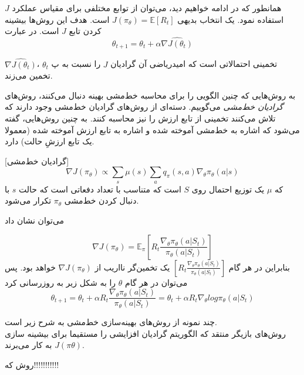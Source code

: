 همانطور که در ادامه خواهیم دید، می‌توان از توابع مختلفی برای مقیاس عملکرد $J$ استفاده نمود. یک انتخاب بدیهی 
$J(\pi_\theta) = \mathbb{E}[R_t]$
است. هدف این روش‌ها بیشینه کردن تابع $J$ است. در عبارت 
$$\theta_{t+1}=\theta_t + \alpha \hat{\nabla J(\theta_t)}$$
 
$\hat{\nabla J(\theta_t)}$،
تخمینی احتمالاتی است که امیدریاضی آن گرادیان  $J$ را نسبت به پ $\theta_t$ تخمین می‌زند.

به روش‌هایی که چنین الگویی را برای محاسبه خط‌مشی بهینه دنبال می‌کنند، روش‌های \textit{گرادیان خط‌مشی } می‌گوییم. دسته‌ای از روش‌های گرادیان خط‌مشی وجود دارند که تلاش می‌کنند تخمینی از تابع ارزش را نیز محاسبه کنند. به چنین روش‌هایی، \textit{} 
 گفته می‌شود که \textit{} 
  اشاره به خط‌مشی آموخته شده و \textit{} 
   اشاره به تابع ارزش آموخته شده (معمولا یک تابع ارزشِ حالت) دارد.

[گرادیان خط‌مشی]
$$\nabla J(\pi_\theta) \propto \sum_{s} \mu(s) \sum_{a} q_\pi(s,a) \nabla_\theta \pi_\theta(a|s)$$
که $\mu$ یک توزیع احتمال روی $S$ است که متناسب با تعداد دفعاتی است که حالت $s$ با دنبال کردن خط‌مشی 
$\pi_\theta$
 تکرار می‌شود.


می‌توان نشان داد 


$$\nabla J(\pi_\theta) = \mathbb{E}_\pi \left[ R_t \frac{\nabla_\theta \pi_\theta (a|S_t)}{\pi_\theta (a|S_t)} \right]$$
بنابراین در هر گام
$\left[ R_t \frac{\nabla_\theta \pi_\theta (a|S_t)}{\pi_\theta (a|S_t)} \right]$
یک تخمین‌گر نااریب از $\nabla J(\pi_\theta)$ خواهد بود\cite{suttonbook}. پس می‌توان در هر گام $\theta$ را به شکل زیر به روزرسانی کرد
$$\theta_{t+1} = \theta_t + \alpha R_t \frac{\nabla_\theta \pi_\theta (a|S_t)}{\pi_\theta (a|S_t)} = \theta_t + \alpha R_t \nabla_\theta log \pi_\theta (a|S_t)$$

چند نمونه از روش‌های بهینه‌سازی خط‌مشی به شرح زیر است. \\
روش‌های بازیگر منتقد
  که الگوریتم 
 گرادیان افزایشی
   را مستقیما برای بیشینه سازی 
$J(\pi\theta)$
به کار می‌برند.

روش  
 که!!!!!!!!!!!

